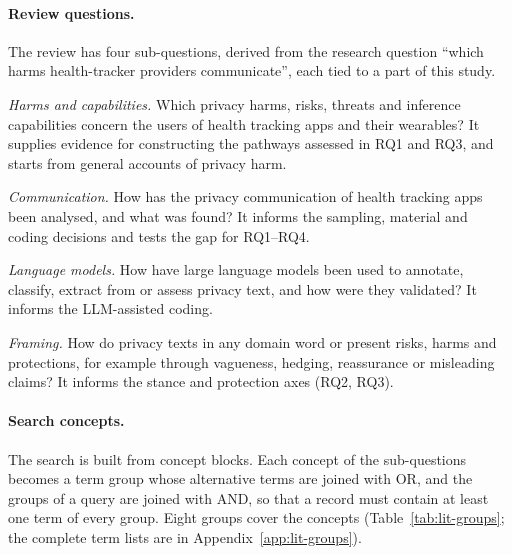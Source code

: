 \paragraph{Review questions.} The review has four sub-questions, derived from the research
question \enquote{which harms health-tracker providers communicate}, each tied to a part of
this study.
\begin{description}[leftmargin=1.5em,itemsep=1pt,topsep=3pt,labelindent=0pt,font=\normalfont\bfseries]
  \item[LQ1] \textit{Harms and capabilities.} Which privacy harms, risks, threats
    and inference capabilities concern the users of health tracking apps and
    their wearables? It supplies evidence for constructing the pathways assessed in RQ1
    and RQ3, and starts from general accounts of privacy harm.
  \item[LQ2] \textit{Communication.} How has the privacy communication of health
    tracking apps been analysed, and what was found? It informs
    the sampling, material and coding decisions and tests the gap for RQ1--RQ4.
  \item[LQ3] \textit{Language models.} How have large language models been used
    to annotate, classify, extract from or assess privacy text, and how were
    they validated? It informs the LLM-assisted coding.
  \item[LQ4] \textit{Framing.} How do privacy texts in any domain word or present
    risks, harms and protections, for example through vagueness, hedging,
    reassurance or misleading claims? It informs the stance and protection axes
    (RQ2, RQ3).
\end{description}

\paragraph{Search concepts.} The search is built from concept blocks. Each
concept of the sub-questions becomes a term group whose alternative terms are
joined with OR, and the groups of a query are joined with AND, so that a record
must contain at least one term of every group. Eight groups cover the concepts
(Table~\ref{tab:lit-groups}; the complete term lists are in
Appendix~\ref{app:lit-groups}).

